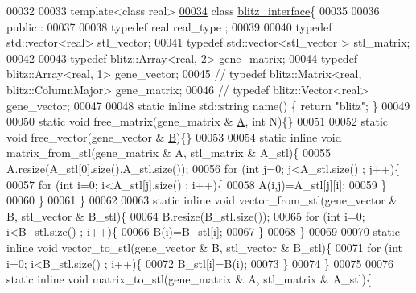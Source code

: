 \begin{DoxyCode}
00032 
00033 \textcolor{keyword}{template}<\textcolor{keyword}{class} real>
\hyperlink{classblitz__interface}{00034} \textcolor{keyword}{class }\hyperlink{classblitz__interface}{blitz\_interface}\{
00035 
00036 public :
00037 
00038   \textcolor{keyword}{typedef} real real\_type ;
00039 
00040   \textcolor{keyword}{typedef} std::vector<real>  stl\_vector;
00041   \textcolor{keyword}{typedef} std::vector<stl\_vector > stl\_matrix;
00042 
00043   \textcolor{keyword}{typedef} blitz::Array<real, 2>  gene\_matrix;
00044   \textcolor{keyword}{typedef} blitz::Array<real, 1>  gene\_vector;
00045 \textcolor{comment}{//   typedef blitz::Matrix<real, blitz::ColumnMajor>  gene\_matrix;}
00046 \textcolor{comment}{//   typedef blitz::Vector<real> gene\_vector;}
00047 
00048   \textcolor{keyword}{static} \textcolor{keyword}{inline} std::string name() \{ \textcolor{keywordflow}{return} \textcolor{stringliteral}{"blitz"}; \}
00049 
00050   \textcolor{keyword}{static} \textcolor{keywordtype}{void} free\_matrix(gene\_matrix & \hyperlink{group___core___module_class_eigen_1_1_matrix}{A}, \textcolor{keywordtype}{int} N)\{\}
00051 
00052   \textcolor{keyword}{static} \textcolor{keywordtype}{void} free\_vector(gene\_vector & \hyperlink{group___core___module_class_eigen_1_1_matrix}{B})\{\}
00053 
00054   \textcolor{keyword}{static} \textcolor{keyword}{inline} \textcolor{keywordtype}{void} matrix\_from\_stl(gene\_matrix & A, stl\_matrix & A\_stl)\{
00055     A.resize(A\_stl[0].size(),A\_stl.size());
00056     \textcolor{keywordflow}{for} (\textcolor{keywordtype}{int} j=0; j<A\_stl.size() ; j++)\{
00057       \textcolor{keywordflow}{for} (\textcolor{keywordtype}{int} i=0; i<A\_stl[j].size() ; i++)\{
00058         A(i,j)=A\_stl[j][i];
00059       \}
00060     \}
00061   \}
00062 
00063   \textcolor{keyword}{static} \textcolor{keyword}{inline} \textcolor{keywordtype}{void} vector\_from\_stl(gene\_vector & B, stl\_vector & B\_stl)\{
00064     B.resize(B\_stl.size());
00065     \textcolor{keywordflow}{for} (\textcolor{keywordtype}{int} i=0; i<B\_stl.size() ; i++)\{
00066       B(i)=B\_stl[i];
00067     \}
00068   \}
00069 
00070   \textcolor{keyword}{static} \textcolor{keyword}{inline} \textcolor{keywordtype}{void} vector\_to\_stl(gene\_vector & B, stl\_vector & B\_stl)\{
00071     \textcolor{keywordflow}{for} (\textcolor{keywordtype}{int} i=0; i<B\_stl.size() ; i++)\{
00072       B\_stl[i]=B(i);
00073     \}
00074   \}
00075 
00076   \textcolor{keyword}{static} \textcolor{keyword}{inline} \textcolor{keywordtype}{void} matrix\_to\_stl(gene\_matrix & A, stl\_matrix & A\_stl)\{

\end{DoxyCode}
